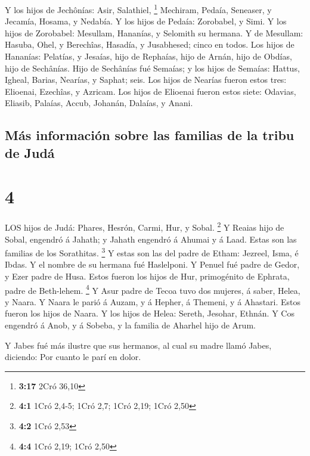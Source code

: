  Y los hijos de Jechônías: Asir, Salathiel, \footnote{\textbf{3:17}
  2Cró 36,10}  Mechiram, Pedaía, Seneaser, y Jecamía,
Hosama, y Nedabía.  Y los hijos de Pedaía: Zorobabel, y
Simi. Y los hijos de Zorobabel: Mesullam, Hananías, y Selomith su
hermana.  Y de Mesullam: Hasuba, Ohel, y Berechîas,
Hasadía, y Jusabhesed; cinco en todos.  Los hijos de
Hananías: Pelatías, y Jesaías, hijo de Rephaías, hijo de Arnán, hijo de
Obdías, hijo de Sechânías.  Hijo de Sechânías fué Semaías;
y los hijos de Semaías: Hattus, Igheal, Barias, Nearías, y Saphat; seis.
 Los hijos de Nearías fueron estos tres: Elioenai,
Ezechîas, y Azricam.  Los hijos de Elioenai fueron estos
siete: Odavias, Eliasib, Palaías, Accub, Johanán, Dalaías, y Anani.

\hypertarget{muxe1s-informaciuxf3n-sobre-las-familias-de-la-tribu-de-juduxe1}{%
\subsection{Más información sobre las familias de la tribu de
Judá}\label{muxe1s-informaciuxf3n-sobre-las-familias-de-la-tribu-de-juduxe1}}

\hypertarget{section-3}{%
\section{4}\label{section-3}}

 LOS hijos de Judá: Phares, Hesrón, Carmi, Hur, y Sobal.
\footnote{\textbf{4:1} 1Cró 2,4-5; 1Cró 2,7; 1Cró 2,19; 1Cró 2,50}
 Y Reaias hijo de Sobal, engendró á Jahath; y Jahath
engendró á Ahumai y á Laad. Estas son las familias de los Sorathitas.
\footnote{\textbf{4:2} 1Cró 2,53}  Y estas son las del padre
de Etham: Jezreel, Isma, é Ibdas. Y el nombre de su hermana fué
Haslelponi.  Y Penuel fué padre de Gedor, y Ezer padre de
Husa. Estos fueron los hijos de Hur, primogénito de Ephrata, padre de
Beth-lehem. \footnote{\textbf{4:4} 1Cró 2,19; 1Cró 2,50}  Y
Asur padre de Tecoa tuvo dos mujeres, á saber, Helea, y Naara.
 Y Naara le parió á Auzam, y á Hepher, á Themeni, y á
Ahastari. Estos fueron los hijos de Naara.  Y los hijos de
Helea: Sereth, Jesohar, Ethnán.  Y Cos engendró á Anob, y á
Sobeba, y la familia de Aharhel hijo de Arum.

 Y Jabes fué más ilustre que sus hermanos, al cual su madre
llamó Jabes, diciendo: Por cuanto le parí en dolor.

